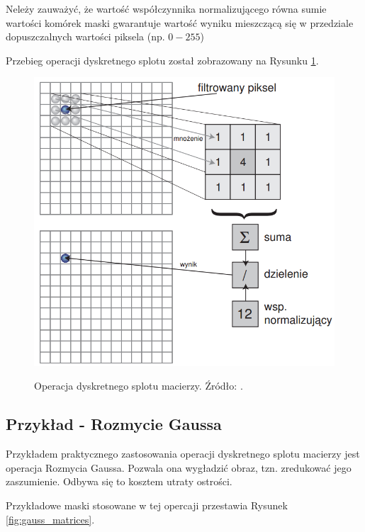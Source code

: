 \documentclass[a4paper,twocolumn,12pt]{article}
\begin{document}
Neleży zauważyć, że wartość współczynnika normalizującego równa sumie wartości komórek maski gwarantuje wartość wyniku mieszczącą się w przedziale dopuszczalnych wartości piksela (np. $0-255$)

Przebieg operacji dyskretnego splotu został zobrazowany na Rysunku \ref{fig:convolution}.

\begin{figure}[!ht]
 \begin{center}
  \scalebox{0.25}
  {
   \includegraphics{../obrazki/filtry/splot.png}
  }
 \end{center}
 \caption{
  Operacja dyskretnego splotu macierzy.
  Źródło: \cite{stec}.
 }
 \label{fig:convolution}
\end{figure}


\subsection{Przykład - Rozmycie Gaussa} \label{sec:gauss}

Przykładem praktycznego zastosowania operacji dyskretnego splotu macierzy jest operacja Rozmycia Gaussa.
Pozwala ona wygładzić obraz, tzn. zredukować jego zaszumienie.
Odbywa się to kosztem utraty ostrości.

Przykładowe maski stosowane w tej opercaji przestawia Rysunek \ref{fig:gauss_matrices}.
\end{document}
